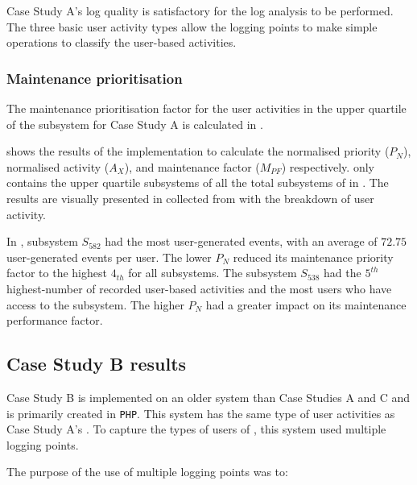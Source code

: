 Case Study A's log quality is satisfactory for the log analysis to be performed. The three basic user activity types allow the logging points to make simple operations to classify the user-based activities. 

\subsubsection{Maintenance prioritisation}
The maintenance prioritisation factor for the user activities in the upper quartile of the subsystem for Case Study A is calculated in .



 shows the results of the implementation  to calculate the normalised priority ($P_N$), normalised activity ($A_X$), and maintenance factor ($M_{PF}$) respectively.  only contains the upper quartile subsystems of all the total subsystems of  in . The results are visually presented in  collected from  with the breakdown of user activity. \par In , subsystem $S_{582}$ had the most user-generated events, with an average of $72.75$ user-generated events per user. The lower $P_N$ reduced its maintenance priority factor to the highest $4_{th}$ for all subsystems. The subsystem $S_{538}$ had the $5^{th}$ highest-number of recorded user-based activities and the most users who have access to the subsystem. The higher $P_N$ had a greater impact on its maintenance performance factor. 

\clearpage

\subsection{Case Study B results}\label{sec:ch3_csB}
Case Study B is implemented on an older system than Case Studies A and C and is primarily created in \texttt{PHP}. This system has the same type of user activities as Case Study A's . To capture the types of users of , this system used multiple logging points. \par The purpose of the use of multiple logging points was to:

